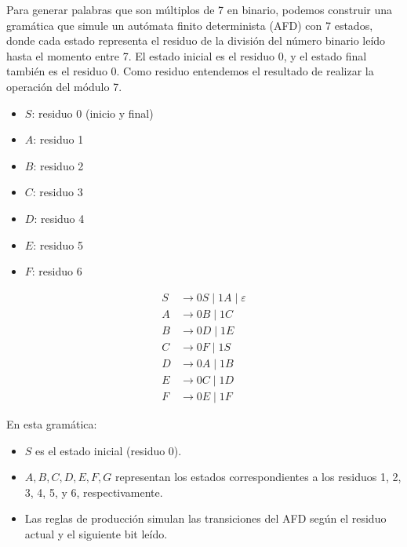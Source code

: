 \documentclass[12pt]{report} %
\begin{document}
\begin{ejercicio}
\begin{itemize}
\begin{itemize}
        \begin{solucion}[difícil.b]

        Para generar palabras que son múltiplos de 7 en binario, podemos construir una gramática que simule un autómata finito determinista (AFD) con 7 estados, donde cada estado representa el residuo de la división del número binario leído hasta el momento entre 7. El estado inicial es el residuo 0, y el estado final también es el residuo 0. Como residuo entendemos el resultado de realizar la operación del módulo 7.

        \begin{itemize}
            \item $S$: residuo 0 (inicio y final)
            \item $A$: residuo 1
            \item $B$: residuo 2
            \item $C$: residuo 3
            \item $D$: residuo 4
            \item $E$: residuo 5
            \item $F$: residuo 6
        \end{itemize}

        \begin{align*}
        S &\rightarrow 0S \mid 1A \mid \varepsilon \\
        A &\rightarrow 0B \mid 1C \\
        B &\rightarrow 0D \mid 1E \\
        C &\rightarrow 0F \mid 1S \\
        D &\rightarrow 0A \mid 1B \\
        E &\rightarrow 0C \mid 1D \\
        F &\rightarrow 0E \mid 1F
        \end{align*}

        En esta gramática: 
        
        \begin{itemize}
            \item $S$ es el estado inicial (residuo 0).
            \item $A, B, C, D, E, F, G$ representan los estados correspondientes a los residuos 1, 2, 3, 4, 5, y 6, respectivamente.
            \item Las reglas de producción simulan las transiciones del AFD según el residuo actual y el siguiente bit leído.
        \end{itemize}


\end{solucion}
\end{itemize}
\end{itemize}
\end{ejercicio}
\end{document}
